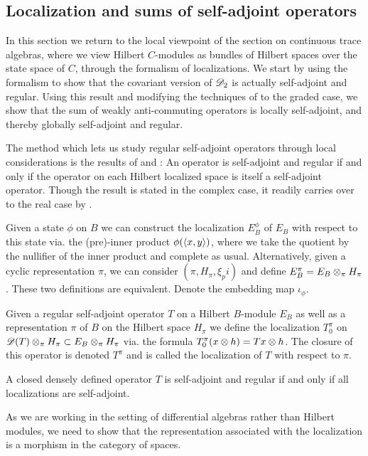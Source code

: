 \subsection{Localization and sums of self-adjoint operators}

In this section we return to the local viewpoint of the section on continuous trace algebras, where we view Hilbert $C$-modules as bundles of Hilbert spaces over the state space of $C$, through the formalism of localizations. We start by using the formalism to show that the covariant version of $\mathscr{D}_2$ is actually self-adjoint and regular. Using this result and modifying the techniques of \cite{locglob} to the graded case, we show that the sum of weakly anti-commuting operators is locally self-adjoint, and thereby globally self-adjoint and regular. 

The method which lets us study regular self-adjoint operators through local considerations is the results of \cite{pierre} and \cite{locglob}: An operator is self-adjoint and regular if and only if the operator on each Hilbert localized space is itself a self-adjoint operator. Though the result is stated in the complex case, it readily carries over to the real case by .
\begin{definition}
	Given a state $\phi$ on $B$ we can construct the localization $E_B^\phi$ of $E_B$ with respect to this state via. the (pre)-inner product $\phi(\ip{x}{y})$, where we take the quotient by the nullifier of the inner product and complete as usual. 
	Alternatively, given a cyclic representation $\pi$, we can consider $(\pi,H_\pi,\xi_pi)$ and define $E_B^\pi=E_B\otimes_\pi H_\pi$. These two definitions are equivalent.  
	Denote the embedding map $\iota_\phi$. 
\end{definition}
\begin{definition}
	Given a regular self-adjoint operator $T$ on a Hilbert $B$-module $E_B$ as well as a representation $\pi$ of $B$ on the Hilbert space $H_\pi$ we define the localization $T_0^\pi$ on $\mathscr{D}(T)\otimes_{\pi} H_\pi\subset E_B \otimes_{\pi} H_\pi$ via. the formula $T_0^\pi(x\otimes h)=Tx\otimes h$. The closure of this operator is denoted $T^\pi$ and is called the localization of $T$ with respect to $\pi$.
\end{definition}
\begin{theorem}
	A closed densely defined operator $T$ is self-adjoint and regular if and only if all localizations are self-adjoint. 
\end{theorem}
As we are working in the setting of differential algebras rather than Hilbert modules, we need to show that the representation associated with the localization is a morphism in the category of spaces. 
